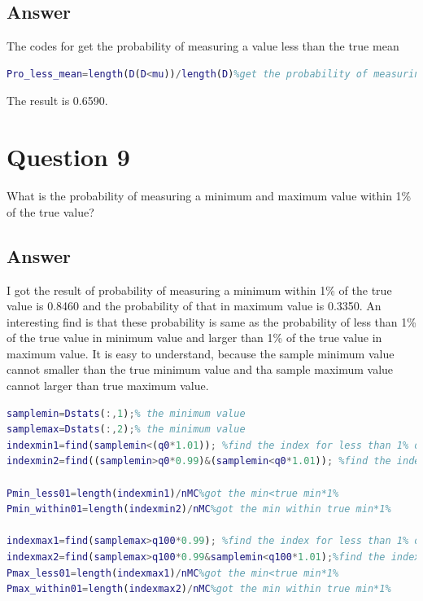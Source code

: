 \documentclass[
	12pt, %
]{fphw}
\begin{document}
\subsection*{Answer}
The codes for get the probability of measuring a value less than the true mean

\begin{lstlisting}[language=Matlab,escapeinside=``]
Pro_less_mean=length(D(D<mu))/length(D)%get the probability of measuring a value less than the true mean
\end{lstlisting}

The result is  0.6590.


\clearpage
\section*{Question 9 }

\begin{problem}
What is the probability of measuring a minimum and maximum value within 1\% of the true value?
\end{problem}

\subsection*{Answer}

I got the result of probability of measuring a minimum  within 1\% of the true value is 0.8460 and the probability of that in maximum value is  0.3350. An interesting find is that these probability is same as the probability of less than 1\% of the true value in minimum value and larger than 1\% of the true value in maximum value. It is easy to understand, because the sample minimum value cannot smaller than the true minimum value and tha sample maximum value cannot larger than true maximum value.
 
 \begin{lstlisting}[language=Matlab,escapeinside=``]
samplemin=Dstats(:,1);% the minimum value 
samplemax=Dstats(:,2);% the minimum value 
indexmin1=find(samplemin<(q0*1.01)); %find the index for less than 1% of true min
indexmin2=find((samplemin>q0*0.99)&(samplemin<q0*1.01)); %find the index for within 1% of true min

Pmin_less01=length(indexmin1)/nMC%got the min<true min*1%
Pmin_within01=length(indexmin2)/nMC%got the min within true min*1%

indexmax1=find(samplemax>q100*0.99); %find the index for less than 1% of true max
indexmax2=find(samplemax>q100*0.99&samplemin<q100*1.01);%find the index for within 1% of true max
Pmax_less01=length(indexmax1)/nMC%got the min<true min*1%
Pmax_within01=length(indexmax2)/nMC%got the min within true min*1%
\end{lstlisting}
 
\end{document}
